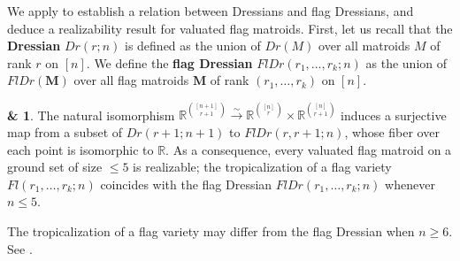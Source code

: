 \documentclass[11pt]{amsart}
\newcommand{\RR}{\mathbb R}
\newcommand{\MM}{{\boldsymbol M}}
\theoremstyle{definition}
\newcommand{\chris}[1]{{\color{cyan} \sf Chris: [#1]}}
\begin{document}
\medskip
We apply  to establish a relation between Dressians and flag Dressians, and deduce a realizability result for valuated flag matroids.  First, let us recall that the \textbf{Dressian} $Dr(r;n)$ is defined as the union of $Dr(M)$ over all matroids $M$ of rank $r$ on $[n]$.  We define the \textbf{flag Dressian} $FlDr(r_1, \ldots, r_k;n)$ as the union of $FlDr(\MM)$ over all flag matroids $\MM$ of rank $(r_1, \ldots, r_k)$ on $[n]$.

\newtheorem*{thm:fibration}{ \& }
\begin{thm:fibration}
The natural isomorphism $\RR^{\binom{[n+1]}{r+1}} \overset\sim\to \RR^{\binom{[n]}{r}} \times \RR^{\binom{[n]}{r+1}}$ induces a surjective map from a subset of $Dr(r+1;n+1)$ to $FlDr(r,r+1;n)$, whose fiber over each point is isomorphic to $\RR$.
As a consequence, every valuated flag matroid on a ground set of size $\leq 5$ is realizable; the tropicalization of a flag variety $Fl(r_1, \ldots, r_k;n)$ coincides with the flag Dressian $FlDr(r_1, \ldots, r_k;n)$ whenever $n\leq 5$.
\end{thm:fibration}

The tropicalization of a flag variety may differ from  the flag Dressian when $n\geq 6$.  See .
%
%
%
%

\end{document}
